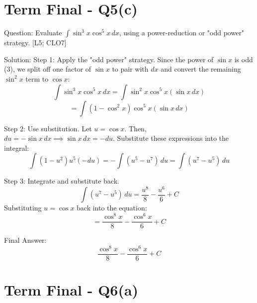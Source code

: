 \documentclass[11pt, a4paper]{article}
\begin{document}

\section*{Term Final - Q5(c)}

Question:
Evaluate $\int \sin^3 x \cos^5 x \, dx$, using a power-reduction or "odd power" strategy. [L5; CLO7]

Solution:
Step 1: Apply the "odd power" strategy.
Since the power of $\sin x$ is odd ($3$), we split off one factor of $\sin x$ to pair with $dx$ and convert the remaining $\sin^2 x$ term to $\cos x$:
\[
\int \sin^3 x \cos^5 x \, dx = \int \sin^2 x \cos^5 x (\sin x \, dx)
\]
\[
= \int (1 - \cos^2 x) \cos^5 x (\sin x \, dx)
\]

Step 2: Use substitution.
Let $u = \cos x$.
Then, $du = -\sin x \, dx \implies \sin x \, dx = -du$.
Substitute these expressions into the integral:
\[
\int (1 - u^2) u^5 (-du) = -\int (u^5 - u^7) \, du = \int (u^7 - u^5) \, du
\]

Step 3: Integrate and substitute back.
\[
\int (u^7 - u^5) \, du = \frac{u^8}{8} - \frac{u^6}{6} + C
\]
Substituting $u = \cos x$ back into the equation:
\[
= \frac{\cos^8 x}{8} - \frac{\cos^6 x}{6} + C
\]

Final Answer:
\[
\boxed{\frac{\cos^8 x}{8} - \frac{\cos^6 x}{6} + C}
\]




\section*{Term Final - Q6(a)}
\end{document}
